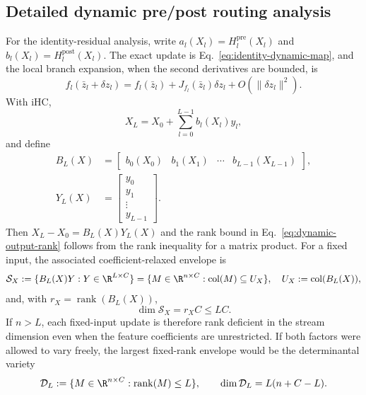 \documentclass{article}
\newcommand{\Hpre}{H^{\mathrm{pre}}}
\newcommand{\Hpost}{H^{\mathrm{post}}}
\begin{document}
\subsection{Detailed dynamic pre/post routing analysis}
\label{app:dynamic-routing-details}
For the identity-residual analysis, write
$a_l(X_l)=\Hpre_l(X_l)$ and $b_l(X_l)=\Hpost_l(X_l)$. The exact update is
Eq.~\ref{eq:identity-dynamic-map}, and the local branch expansion, when the
second derivatives are bounded, is
\begin{equation}
 f_l(\bar z_l+\delta z_l)=f_l(\bar z_l)+J_{f_l}(\bar z_l)\delta z_l
 +O(\|\delta z_l\|^2).
 \label{eq:local-linear-branch}
\end{equation}
With iHC,
\begin{equation}
 X_L=X_0+\sum_{l=0}^{L-1}b_l(X_l)y_l,
 \label{eq:dynamic-sum}
\end{equation}
and define
\begin{equation}
\begin{aligned}
 B_L(X)&=\begin{bmatrix}b_0(X_0)&b_1(X_1)&\cdots&b_{L-1}(X_{L-1})\end{bmatrix},\\
 Y_L(X)&=\begin{bmatrix}y_0\\y_1\\\vdots\\y_{L-1}\end{bmatrix}.
\end{aligned}
 \label{eq:dynamic-by}
\end{equation}
Then $X_L-X_0=B_L(X)Y_L(X)$ and the rank bound in
Eq.~\ref{eq:dynamic-output-rank} follows from the rank inequality for a matrix
product. For a fixed input, the associated coefficient-relaxed envelope is
\begin{equation}
 \mathcal S_X:=\{B_L(X)Y:Y\in\R^{L\times C}\}
 =\{M\in\R^{n\times C}:\operatorname{col}(M)\subseteq U_X\},
 \quad U_X:=\operatorname{col}(B_L(X)),
 \label{eq:fixed-input-output-space}
\end{equation}
and, with $r_X=\operatorname{rank}(B_L(X))$,
\begin{equation}
 \dim\mathcal S_X=r_XC\leq LC.
 \label{eq:fixed-input-space-dim}
\end{equation}
If $n>L$, each fixed-input update is therefore rank deficient in the stream
dimension even when the feature coefficients are unrestricted. If both factors
were allowed to vary freely, the largest fixed-rank envelope would be the
determinantal variety
\begin{equation}
 \mathcal D_L:=\{M\in\R^{n\times C}:\operatorname{rank}(M)\leq L\},\mspace{36mu}
 \dim\mathcal D_L=L(n+C-L).
 \label{eq:rank-variety}
\end{equation}
\end{document}
